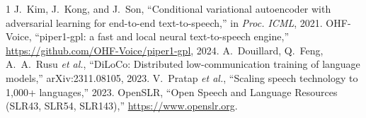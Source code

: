 \documentclass[conference]{IEEEtran}
\begin{document}
\begin{thebibliography}{1}
 J.~Kim, J.~Kong, and J.~Son, ``Conditional variational autoencoder with adversarial learning
for end-to-end text-to-speech,'' in \emph{Proc. ICML}, 2021.
 OHF-Voice, ``piper1-gpl: a fast and local neural text-to-speech engine,''
\url{https://github.com/OHF-Voice/piper1-gpl}, 2024.
 A.~Douillard, Q.~Feng, A.~A.~Rusu \emph{et al.}, ``DiLoCo: Distributed low-communication
training of language models,'' arXiv:2311.08105, 2023.
 V.~Pratap \emph{et al.}, ``Scaling speech technology to 1{,}000+ languages,'' 2023.
 OpenSLR, ``Open Speech and Language Resources (SLR43, SLR54, SLR143),''
\url{https://www.openslr.org}.
\end{thebibliography}
\end{document}

